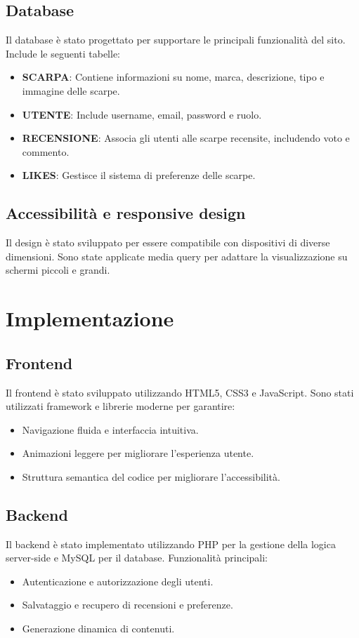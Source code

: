 \documentclass[a4paper, 12pt]{article}
\begin{document}
\begin{justify}
\subsection{Database}
Il database \`e stato progettato per supportare le principali funzionalit\`a del sito. Include le seguenti tabelle:
\begin{itemize}
    \item \textbf{SCARPA}: Contiene informazioni su nome, marca, descrizione, tipo e immagine delle scarpe.
    \item \textbf{UTENTE}: Include username, email, password e ruolo.
    \item \textbf{RECENSIONE}: Associa gli utenti alle scarpe recensite, includendo voto e commento.
    \item \textbf{LIKES}: Gestisce il sistema di preferenze delle scarpe.
\end{itemize}

\subsection{Accessibilit\`a e responsive design}
Il design \`e stato sviluppato per essere compatibile con dispositivi di diverse dimensioni. Sono state applicate media query per adattare la visualizzazione su schermi piccoli e grandi.

\section{Implementazione}
\subsection{Frontend}
Il frontend \`e stato sviluppato utilizzando HTML5, CSS3 e JavaScript. Sono stati utilizzati framework e librerie moderne per garantire:
\begin{itemize}
    \item Navigazione fluida e interfaccia intuitiva.
    \item Animazioni leggere per migliorare l'esperienza utente.
    \item Struttura semantica del codice per migliorare l'accessibilit\`a.
\end{itemize}

\subsection{Backend}
Il backend \`e stato implementato utilizzando PHP per la gestione della logica server-side e MySQL per il database. Funzionalit\`a principali:
\begin{itemize}
    \item Autenticazione e autorizzazione degli utenti.
    \item Salvataggio e recupero di recensioni e preferenze.
    \item Generazione dinamica di contenuti.
\end{itemize}


\end{justify}
\end{document}

